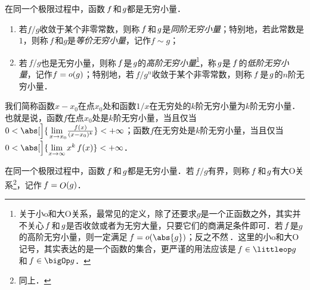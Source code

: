 \begin{definition*}
  在同一个极限过程中，函数\(\,f\mkern2mu\)和\(\mkern1mu g\)都是无穷小量．
  \begin{enumerate}[topsep=3pt,itemsep=0ex]
    \renewcommand{\labelenumi}{\enumparen{\arabic{enumi}}}
  \item 若\(f/g\)收敛于某个非零常数，则称\(\,f\mkern2mu\)和\(\mkern2mu g\)是\emph{同阶无穷小量}；特别地，若此常数是\(1\)，则称\(\,f\,\)和\(g\)是\emph{等价无穷小量}，记作\(f \sim g\)；
  \item 若\(\,f/g\)也是无穷小量，则称\(\,f\mkern1mu\)是\(\mkern1mu g\)的\emph{高阶无穷小量}\footnote{关于小o和大O关系，最常见的定义，除了还要求\(g\)是一个正函数之外，其实并不关心\(\mkern2mu f\mkern2mu\)和\(\mkern2mu g\)是否收敛或者为无穷大量，只要它们的商满足条件即可．若\(\mkern2mu f\mkern1mu\)是\(g\)的高阶无穷小量，则一定满足\(\,f = \littleo(\abs{g})\)；反之不然\,．这里的小o和大O记号，其实表达的是一个函数的集合，更严谨的用法应该是\(\,f \in \littleop g\)和\(\,f \in \bigOp g\)．}，称\(\mkern2mu g\)是\(\,f\mkern2mu\)的\emph{低阶无穷小量}，记作\(f= \mathop{\relax o}\nolimits(g)\)；特别地，若\(\,f/g^n\)收敛于某个非零常数，则称\(\,f\mkern2mu\)是\(\mkern2mu g\)的\(n\)阶无穷小量．
  \end{enumerate}

  \begin{remark}
    我们简称函数\(x-x_0\)在点\(x_0\)处和函数\(1/x\)在无穷处的\(k\)阶无穷小量为\(k\)阶无穷小量．也就是说，函数\(f\)在点\(x_0\)处是\(k\)阶无穷小量，当且仅当\(0 < \abs[\Big]{\lim\limits_{\,x \to x_0\!} \frac{f(x)}{(x-x_0)^k}} < +\infty\)；函数\(f\)在无穷处是\(k\)阶无穷小量，当且仅当\(0 < \abs[\Big]{\lim\limits_{x\to\infty} x^k\,f(x)} < +\infty\)．
  \end{remark}
\end{definition*}

\begin{definition*}
  在同一个极限过程中，函数\(\,f\mkern2mu\)和\(\mkern2mu g\)都是无穷小量．若\(\,f/g\)有界，则称\(\,f\mkern2mu\)和\(\mkern2mu g\)有大O关系\footnote{同上．}，记作\(\,f = \mathop{\relax O}\nolimits(g)\)．
\end{definition*}


